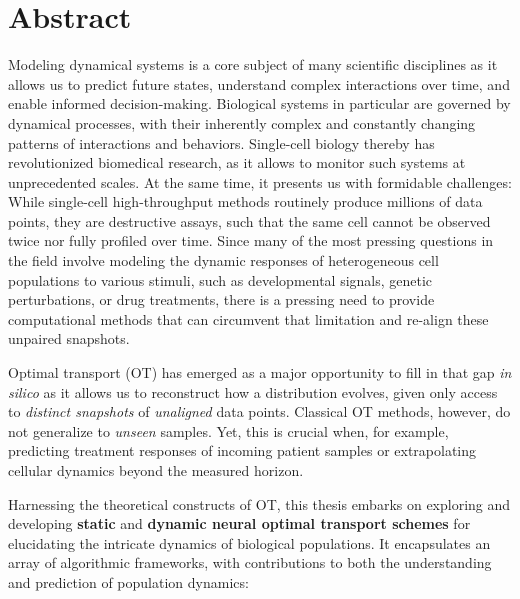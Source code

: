 \begingroup
\let\clearpage\relax
\let\cleardoublepage\relax
\let\cleardoublepage\relax

\chapter*{Abstract}

Modeling dynamical systems is a core subject of many scientific disciplines as it allows us to predict future states, understand complex interactions over time, and enable informed decision-making.
Biological systems in particular are governed by dynamical processes, with their inherently complex and constantly changing patterns of interactions and behaviors.
Single-cell biology thereby has revolutionized biomedical research, as it allows to monitor such systems at unprecedented scales.
At the same time, it presents us with formidable challenges: While single-cell high-throughput methods routinely produce millions of data points, they are destructive assays, such that the same cell cannot be observed twice nor fully profiled over time.
Since many of the most pressing questions in the field involve modeling the dynamic responses of heterogeneous cell populations to various stimuli, such as developmental signals, genetic perturbations, or drug treatments, there is a pressing need to provide computational methods that can circumvent that limitation and re-align these unpaired snapshots.

Optimal transport (OT) has emerged as a major opportunity to fill in that gap \textit{in silico} as it allows us to reconstruct how a distribution evolves, given only access to \emph{distinct snapshots} of \emph{unaligned} data points.
Classical OT methods, however, do not generalize to \emph{unseen} samples. Yet, this is crucial when, for example, predicting treatment responses of incoming patient samples or extrapolating cellular dynamics beyond the measured horizon.

Harnessing the theoretical constructs of OT, this thesis embarks on exploring and developing \textbf{static} and \textbf{dynamic neural optimal transport schemes} for elucidating the intricate dynamics of biological populations. It encapsulates an array of algorithmic frameworks, with contributions to both the understanding and prediction of population dynamics:


